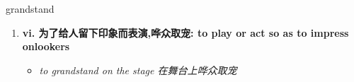 
\begin{frame}
{\huge grandstand}
\begin{center}
\begin{enumerate}\Large
  \item \textbf{vi. 为了给人留下印象而表演,哗众取宠: to play or act so as to impress onlookers}
  \begin{itemize}
    \item \em{\Large{to grandstand on the stage 在舞台上哗众取宠}}
  \end{itemize}
\end{enumerate}
\end{center}
\end{frame}
